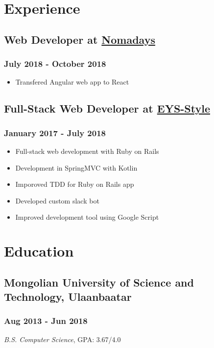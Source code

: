 \documentclass[letterpaper]{article}
\date{\today}
\title{}
\begin{document}

\section{Experience}
\label{sec:org9cfe5cf}
\subsection{Web Developer at \href{https:nomadays.com}{Nomadays}}
\label{sec:org2aa1394}
\subsubsection{July 2018 - October 2018}
\label{sec:org599026a}
\begin{itemize}
\item Transfered Angular web app to React
\end{itemize}
\subsection{Full-Stack Web Developer at \href{http:www.eys-style.com}{EYS-Style}}
\label{sec:orge5fe856}
\subsubsection{January 2017 - July 2018}
\label{sec:org925062a}
\begin{itemize}
\item Full-stack web development with Ruby on Rails
\item Development in SpringMVC with Kotlin
\item Imporoved TDD for Ruby on Rails app
\item Developed custom slack bot
\item Improved development tool using Google Script
\end{itemize}
\section{Education}
\label{sec:orgc1630ab}
\subsection{Mongolian University of Science and Technology, Ulaanbaatar}
\label{sec:org1287895}
\subsubsection{Aug 2013 - Jun 2018}
\label{sec:org2e89dbd}
\emph{B.S. Computer Science}, GPA: 3.67/4.0
\end{document}
